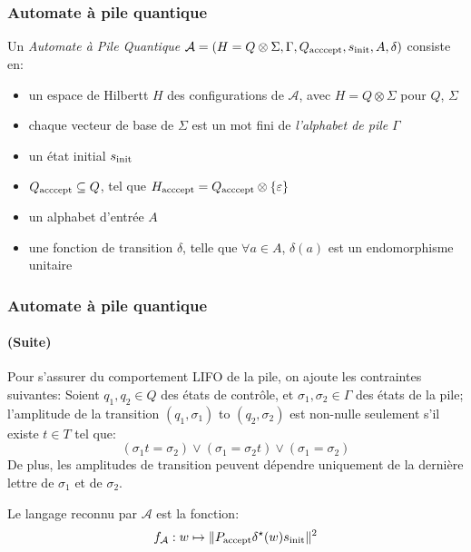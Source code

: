 \documentclass[aspectratio=169]{beamer}
\theoremstyle{plain}
\theoremstyle{definition}
\begin{document}
\begin{frame}
    \frametitle{Automate à pile quantique}
    \begin{definition}[QPDA]
        Un \emph{Automate à Pile Quantique} $\mathcal{A}=(H=Q\otimes \Sigma, \Gamma, Q_{\textnormal{acccept}}, s_{\textnormal{init}}, A, \delta)$ consiste en:
        \begin{itemize}[label=--, noitemsep]
            \item un espace de Hilbertt $H$ des configurations de $\mathcal{A}$, avec $H=Q\otimes \Sigma$ pour $Q$, $\Sigma$
            \item chaque vecteur de base de $\Sigma$ est un mot fini de \emph{l'alphabet de pile} $\Gamma$
            \item un état initial $s_{\textnormal{init}}$
            \item $Q_{\textnormal{acccept}} \subseteq Q$, tel que $H_{\textnormal{acccept}}=Q_{\textnormal{acccept}}\otimes \{\varepsilon\}$
            \item un alphabet d'entrée $A$
            \item une fonction de transition $\delta$, telle que $\forall a\in A$, $\delta(a)$ est un endomorphisme unitaire
        \end{itemize}
    \end{definition}
\end{frame}
\begin{frame}
    \frametitle{Automate à pile quantique}
    \framesubtitle{(Suite)}
    Pour s'assurer du comportement LIFO de la pile, on ajoute les contraintes suivantes:
    Soient $q_1, q_2\in Q$ des états de contrôle, et $\sigma_1, \sigma_2\in \Gamma$ des états de la pile; l'amplitude de la transition $(q_1, \sigma_1)$ to $(q_2, \sigma_2)$ est non-nulle seulement s'il existe $t\in T$ tel que:
    \begin{equation*}
        (\sigma_1t = \sigma_2) \lor (\sigma_1 = \sigma_2t) \lor (\sigma_1 = \sigma_2)
    \end{equation*}
    De plus, les amplitudes de transition peuvent dépendre uniquement de la dernière lettre de $\sigma_1$ et de $\sigma_2$.

    Le langage reconnu par $\mathcal{A}$ est la fonction:
    \begin{equation*}
        f_{\mathcal{A}} : w \mapsto \|P_{\textnormal{accept}}\delta^\star(w)s_{\textnormal{init}}\|^2
    \end{equation*}
\end{frame}
\end{document}
